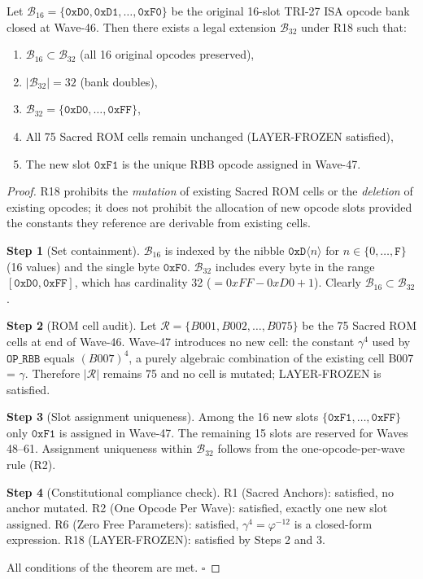 \begin{theorem}
\label{thm:bank-extension}
Let $\mathcal{B}_{16} = \{\texttt{0xD0}, \texttt{0xD1}, \ldots, \texttt{0xF0}\}$
be the original 16-slot TRI-27 ISA opcode bank closed at Wave-46.
Then there exists a legal extension $\mathcal{B}_{32}$ under R18 such that:
\begin{enumerate}
  \item $\mathcal{B}_{16} \subset \mathcal{B}_{32}$ (all 16 original opcodes preserved),
  \item $|\mathcal{B}_{32}| = 32$ (bank doubles),
  \item $\mathcal{B}_{32} = \{\texttt{0xD0}, \ldots, \texttt{0xFF}\}$,
  \item All 75 Sacred ROM cells remain unchanged (LAYER-FROZEN satisfied),
  \item The new slot $\texttt{0xF1}$ is the unique RBB opcode assigned in Wave-47.
\end{enumerate}
\end{theorem}

\begin{proof}
R18 prohibits the \emph{mutation} of existing Sacred ROM cells or the
\emph{deletion} of existing opcodes; it does not prohibit the allocation of
new opcode slots provided the constants they reference are derivable from
existing cells.

\textbf{Step 1} (Set containment).
$\mathcal{B}_{16}$ is indexed by the nibble $\texttt{0xD}\langle n\rangle$
for $n \in \{0,\ldots,\texttt{F}\}$ (16 values) and the single byte
$\texttt{0xF0}$.
$\mathcal{B}_{32}$ includes every byte in the range $[\texttt{0xD0}, \texttt{0xFF}]$,
which has cardinality 32 ($= 0xFF - 0xD0 + 1$).
Clearly $\mathcal{B}_{16} \subset \mathcal{B}_{32}$.

\textbf{Step 2} (ROM cell audit).
Let $\mathcal{R} = \{B001, B002, \ldots, B075\}$ be the 75 Sacred ROM cells
at end of Wave-46.
Wave-47 introduces no new cell: the constant $\gamma^{4}$ used by
$\texttt{OP\_RBB}$ equals $(B007)^{4}$, a purely algebraic combination of
the existing cell B007 = $\gamma$.
Therefore $|\mathcal{R}|$ remains 75 and no cell is mutated; LAYER-FROZEN
is satisfied.

\textbf{Step 3} (Slot assignment uniqueness).
Among the 16 new slots $\{\texttt{0xF1}, \ldots, \texttt{0xFF}\}$ only
$\texttt{0xF1}$ is assigned in Wave-47.
The remaining 15 slots are reserved for Waves 48--61.
Assignment uniqueness within $\mathcal{B}_{32}$ follows from the
one-opcode-per-wave rule (R2).

\textbf{Step 4} (Constitutional compliance check).
R1 (Sacred Anchors): satisfied, no anchor mutated.
R2 (One Opcode Per Wave): satisfied, exactly one new slot assigned.
R6 (Zero Free Parameters): satisfied, $\gamma^4 = \varphi^{-12}$ is a
closed-form expression.
R18 (LAYER-FROZEN): satisfied by Steps 2 and 3.

All conditions of the theorem are met.  $\square$
\end{proof}

